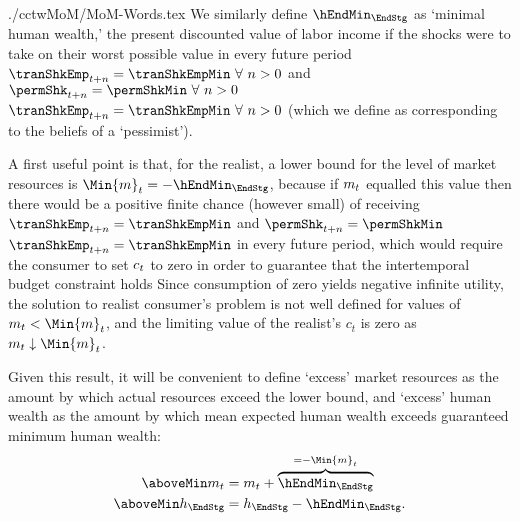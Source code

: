 \documentclass[SolvingMicroDSOPs]{subfiles}
\begin{document}
\begin{verbatimwrite}{./cctwMoM/MoM-Words.tex}
  We similarly define $\hEndMin_{\EndStg}$ as `minimal human wealth,' the
  present discounted value of labor income if the shocks were to take on
  their worst possible value in every future period \PermShkOn
  {$\tranShkEmp_{t+n} = \tranShkEmpMin ~\forall~n>0$ and $\permShk_{t+n} =
    \permShkMin ~\forall~n>0$} {$\tranShkEmp_{t+n} = \tranShkEmpMin
    ~\forall~n>0$} (which we define as corresponding to the beliefs of a
  `pessimist').


  A first useful point is that, for the realist, a lower bound for the
  level of market resources is $\Min{m}_{\prd} = -\hEndMin_{\EndStg}$, because
  if $m_{t}$ equalled this value then there would be a positive finite
  chance (however small) of receiving \PermShkOn
  {$\tranShkEmp_{t+n}=\tranShkEmpMin$ and $\permShk_{t+n}=\permShkMin$}
  {$\tranShkEmp_{t+n}=\tranShkEmpMin$}
  in
  every future period, which would require the consumer to set $c_{t}$
  to zero in order to guarantee that the intertemporal budget constraint
  holds  Since consumption of zero yields negative
  infinite utility, the solution to realist consumer's problem is not well
  defined for values of $m_{\prd} < \Min{m}_{\prd}$, and the limiting
  value of the realist's $c_t$ is zero as $m_{\prd} \downarrow \Min{m}_{\prd}$.

  Given this result, it will be convenient to define `excess' market
  resources as the amount by which actual resources exceed the lower
  bound, and `excess' human wealth as the amount by which mean expected human wealth
  exceeds guaranteed minimum human wealth:
  \begin{equation*}\begin{gathered}\begin{aligned}
        \aboveMin \mNrm_{\prd}  & = m_{\prd}+\overbrace{\hEndMin_{\EndStg}}^{=-\Min{m}_{\prd}}
        \\  \aboveMin \hNrm_{\EndStg}  & = \hNrm_{\EndStg}-\hEndMin_{\EndStg}.
      \end{aligned}\end{gathered}\end{equation*}


\end{verbatimwrite}
\end{document}
